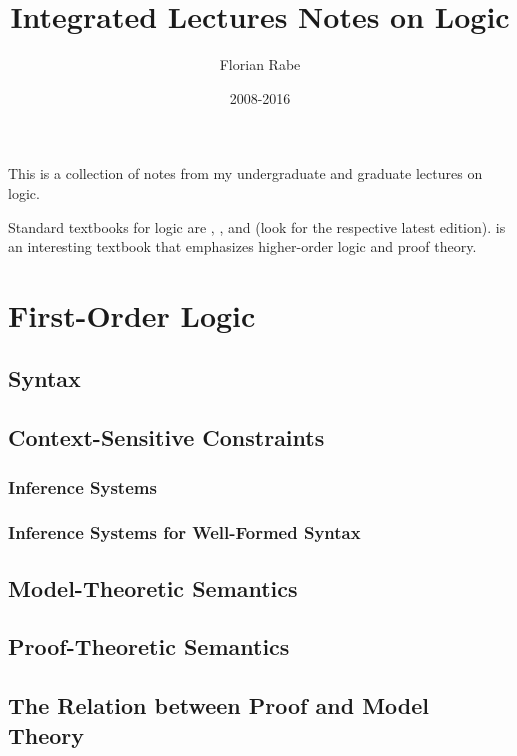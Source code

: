 \documentclass{book}
\title{Integrated Lectures Notes on Logic}
\author{Florian Rabe}
\date{2008-2016}
\begin{document}
\maketitle

\tableofcontents
\newpage

This is a collection of notes from my undergraduate and graduate lectures on logic.

Standard textbooks for logic are \cite{fol_gallier}, \cite{fol_smullyan}, and \cite{intrologicenderton} (look for the respective latest edition).
\cite{andrews_truthproof} is an interesting textbook that emphasizes higher-order logic and proof theory.

\part{First-Order Logic}\label{part:fol}

\chapter{Syntax}\label{sec:syn}
  
  
\chapter{Context-Sensitive Constraints}\label{sec:infsys}
  \section{Inference Systems}
     
  \section{Inference Systems for Well-Formed Syntax}
     

\chapter{Model-Theoretic Semantics}\label{sec:mt}
  

\chapter{Proof-Theoretic Semantics}\label{sec:pt}
  

\chapter{The Relation between Proof and Model Theory}
  
\end{document}
